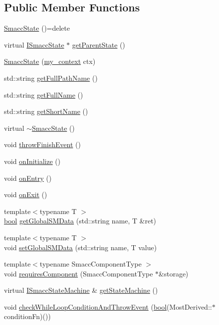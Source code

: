 \subsection*{Public Member Functions}
\begin{DoxyCompactItemize}
\item 
\hyperlink{classsmacc_1_1SmaccState_a2fbeaca0f063a909d17de2c3040c8d17}{Smacc\+State} ()=delete
\item 
virtual \hyperlink{classsmacc_1_1ISmaccState}{I\+Smacc\+State} $\ast$ \hyperlink{classsmacc_1_1SmaccState_a69fc0aa1dbe0c00501f2890616225004}{get\+Parent\+State} ()
\item 
\hyperlink{classsmacc_1_1SmaccState_adc225018fe91da47e6e9f1d20150b26a}{Smacc\+State} (\hyperlink{structsmacc_1_1SmaccState_1_1my__context}{my\+\_\+context} ctx)
\item 
std\+::string \hyperlink{classsmacc_1_1SmaccState_a1a2ae90b80ba8ca88b4b9b66972abfbd}{get\+Full\+Path\+Name} ()
\item 
std\+::string \hyperlink{classsmacc_1_1SmaccState_a897dbdfe52a8b944d4bf1844ddcc3aa5}{get\+Full\+Name} ()
\item 
std\+::string \hyperlink{classsmacc_1_1SmaccState_a4db028a85244653e48957d2b3371413d}{get\+Short\+Name} ()
\item 
virtual \hyperlink{classsmacc_1_1SmaccState_a41b2515faf76648c6d69fe09108d2691}{$\sim$\+Smacc\+State} ()
\item 
void \hyperlink{classsmacc_1_1SmaccState_a56ccdfaf818ed6409dcbd4ab8b01c60e}{throw\+Finish\+Event} ()
\item 
void \hyperlink{classsmacc_1_1SmaccState_a49e958861b6ddbe9468e39c1919fde92}{on\+Initialize} ()
\item 
void \hyperlink{classsmacc_1_1SmaccState_a4a10a74fdbe51a798b8d651668b8ed9a}{on\+Entry} ()
\item 
void \hyperlink{classsmacc_1_1SmaccState_a82ca7c69153e86dc5eedf3f909560f3a}{on\+Exit} ()
\item 
{\footnotesize template$<$typename T $>$ }\\\hyperlink{classbool}{bool} \hyperlink{classsmacc_1_1SmaccState_ad53b5be2760eb7ffb50f3b2e542b65f1}{get\+Global\+S\+M\+Data} (std\+::string name, T \&ret)
\item 
{\footnotesize template$<$typename T $>$ }\\void \hyperlink{classsmacc_1_1SmaccState_a98f2673b257479e0a3615d5d8279a591}{set\+Global\+S\+M\+Data} (std\+::string name, T value)
\item 
{\footnotesize template$<$typename Smacc\+Component\+Type $>$ }\\void \hyperlink{classsmacc_1_1SmaccState_a2febb778d5c3d80b9c034576b5a92b65}{requires\+Component} (Smacc\+Component\+Type $\ast$\&storage)
\item 
virtual \hyperlink{classsmacc_1_1ISmaccStateMachine}{I\+Smacc\+State\+Machine} \& \hyperlink{classsmacc_1_1SmaccState_afc39f8e0ca4001b2159a100da2fccd0e}{get\+State\+Machine} ()
\item 
void \hyperlink{classsmacc_1_1SmaccState_a80082718f226bebedb589f0c4696001d}{check\+While\+Loop\+Condition\+And\+Throw\+Event} (\hyperlink{classbool}{bool}(Most\+Derived\+::$\ast$condition\+Fn)())
\end{DoxyCompactItemize}
